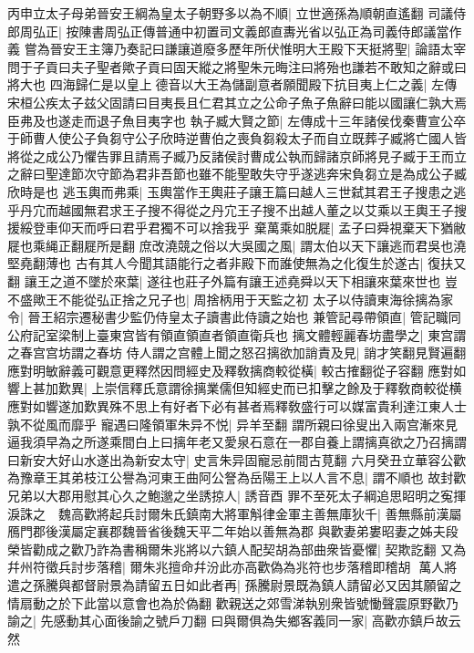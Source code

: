丙申立太子母弟晉安王綱為皇太子朝野多以為不順|{
	立世適孫為順朝直遙翻}
司議侍郎周弘正|{
	按陳書周弘正傳普通中初置司文義郎直夀光省以弘正為司義侍郎議當作義}
嘗為晉安王主簿乃奏記曰謙讓道廢多歷年所伏惟明大王殿下天挺將聖|{
	論語太宰問于子貢曰夫子聖者歟子貢曰固天縱之將聖朱元晦注曰將殆也謙若不敢知之辭或曰將大也}
四海歸仁是以皇上德音以大王為儲副意者願聞殿下抗目夷上仁之義|{
	左傳宋桓公疾太子兹父固請曰目夷長且仁君其立之公命子魚子魚辭曰能以國讓仁孰大焉臣弗及也遂走而退子魚目夷字也}
執子臧大賢之節|{
	左傳成十三年諸侯伐秦曹宣公卒于師曹人使公子負芻守公子欣時逆曹伯之喪負芻殺太子而自立既葬子臧將亡國人皆將從之成公乃懼告罪且請焉子臧乃反諸侯討曹成公執而歸諸京師將見子臧于王而立之辭曰聖達節次守節為君非吾節也雖不能聖敢失守乎遂逃奔宋負芻立是為成公子臧欣時是也}
逃玉輿而弗乘|{
	玉輿當作王輿莊子讓王篇曰越人三世弑其君王子搜患之逃乎丹宂而越國無君求王子搜不得從之丹宂王子搜不出越人董之以艾乘以王輿王子搜援綏登車仰天而呼曰君乎君獨不可以捨我乎}
棄萬乘如脱屣|{
	孟子曰舜視棄天下猶敝屣也乘䋲正翻屣所是翻}
庶改澆競之俗以大吳國之風|{
	謂太伯以天下讓逃而君吳也澆堅堯翻薄也}
古有其人今聞其語能行之者非殿下而誰使無為之化復生於遂古|{
	復扶又翻}
讓王之道不墜於來葉|{
	遂往也莊子外篇有讓王述堯舜以天下相讓來葉來世也}
豈不盛歟王不能從弘正捨之兄子也|{
	周捨柄用于天監之初}
太子以侍讀東海徐摛為家令|{
	晉王紹宗遷秘書少監仍侍皇太子讀書此侍讀之始也}
兼管記尋帶領直|{
	管記職同公府記室梁制上臺東宫皆有領直領直者領直衛兵也}
摛文體輕麗春坊盡學之|{
	東宫謂之春宫宫坊謂之春坊}
侍人謂之宫體上聞之怒召摛欲加誚責及見|{
	誚才笑翻見賢遍翻}
應對明敏辭義可觀意更釋然因問經史及釋敎摛商較從橫|{
	較古搉翻從子容翻}
應對如響上甚加歎異|{
	上崇信釋氏意謂徐摛業儒但知經史而已扣擊之餘及于釋敎商較從横應對如響遂加歎異殊不思上有好者下必有甚者焉釋敎盛行可以媒富貴利達江東人士孰不從風而靡乎}
寵遇曰隆領軍朱异不悦|{
	异羊至翻}
謂所親曰徐叟出入兩宫漸來見逼我須早為之所遂乘間白上曰摛年老又愛泉石意在一郡自養上謂摛真欲之乃召摛謂曰新安大好山水遂出為新安太守|{
	史言朱异固寵忌前間古莧翻}
六月癸丑立華容公歡為豫章王其弟枝江公譽為河東王曲阿公詧為岳陽王上以人言不息|{
	謂不順也}
故封歡兄弟以大郡用慰其心久之鮑邈之坐誘掠人|{
	誘音酉}
罪不至死太子綱追思眧明之寃揮淚誅之　魏高歡將起兵討爾朱氏鎮南大將軍斛律金軍主善無庫狄千|{
	善無縣前漢屬鴈門郡後漢屬定襄郡魏晉省後魏天平二年始以善無為郡}
與歡妻弟婁昭妻之姊夫段榮皆勸成之歡乃詐為書稱爾朱兆將以六鎮人配契胡為部曲衆皆憂懼|{
	契欺訖翻}
又為幷州符徵兵討步落稽|{
	爾朱兆擅命幷汾此亦高歡偽為兆符也步落稽即稽胡}
萬人將遣之孫騰與都督尉景為請留五日如此者再|{
	孫騰尉景既為鎮人請留必又因其願留之情扇動之於下此當以意會也為於偽翻}
歡親送之郊雪涕執别衆皆號慟聲震原野歡乃諭之|{
	先感動其心面後諭之號戶刀翻}
曰與爾俱為失鄉客義同一家|{
	高歡亦鎮戶故云然}
